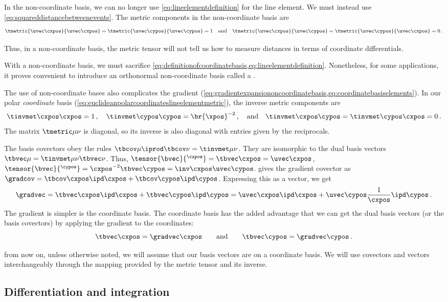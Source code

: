In the non-coordinate basis, we can no longer use \cref{eq:lineelementdefinition} for the line element. We must instead use \cref{eq:squareddistancebetweenevents}. The metric components in the non-coordinate basis are
%
\begin{equation}\label{eq:metriccomponentsinnoncoordinatebasis}
  \tmetric{\uvec\cxpos}{\uvec\cxpos} = \tmetric{\uvec\cypos}{\uvec\cypos} = 1\quad\text{and}\quad
  \tmetric{\uvec\cxpos}{\uvec\cypos} = \tmetric{\uvec\cypos}{\uvec\cxpos} = 0\,.
\end{equation}

 Thus, in a non-coordinate basis, the metric tensor will not tell us how to measure distances in terms of coordinate differentials.

With a non-coordinate basis, we must sacrifice \cref{eq:definitionofcoordinatebasis,eq:lineelementdefinition}. Nonetheless, for some applications, it proves convenient to introduce an orthonormal non-coordinate basis called a .

 The use of non-coordinate bases also complicates the gradient (\cref{eq:gradientexpansiononcoordinatebasis,eq:coordinatebasiselements}). In our polar \emph{coordinate} basis (\cref{eq:euclideanpolarcoordinateslineelementmetric}), the inverse metric components are
%
\begin{equation}\label{eq:invmetriccomponentsincoordinatebasis}
  \tinvmet\cxpos\cxpos = 1\,,\quad
  \tinvmet\cypos\cypos = \br{\xpos}^{-2}\,,\quad\text{and}\quad
  \tinvmet\cxpos\cypos = \tinvmet\cypos\cxpos = 0\,.
\end{equation}
%
 The matrix $\tmetric\mu\nu$ is diagonal, so its inverse is also diagonal with entries given by the reciprocals.

The basis covectors obey the rules $\tbcov\mu\iprod\tbcov\nu = \tinvmet\mu\nu$. They are isomorphic to the dual basis vectors $\tbvec\mu = \tinvmet\mu\nu\tbvec\nu$. Thus, $\tensor{\bvec}{^\cxpos} = \tbvec\cxpos = \uvec\cxpos$, $\tensor{\bvec}{^\cypos} = \cxpos^{-2}\tbvec\cypos = \inv\cxpos\uvec\cypos$.  gives the gradient covector as $\gradcov = \tbcov\cxpos\ipd\cxpos + \tbcov\cypos\ipd\cypos$. Expressing this as a vector, we get
%
\begin{equation}\label{eq:gradientvectorinpolarcoordinates}
  \gradvec = \tbvec\cxpos\ipd\cxpos + \tbvec\cypos\ipd\cypos
           = \uvec\cxpos\ipd\cxpos + \uvec\cypos\dfrac 1\cxpos\ipd\cypos\,.
\end{equation}
%
 The gradient is simpler is the coordinate basis. The coordinate basis has the added advantage that we can get the dual basis vectors (or the basis covectors) by applying the gradient to the coordinates:
%
\begin{equation*}
  \tbvec\cxpos = \gradvec\cxpos\qquad\text{and}\qquad
  \tbvec\cypos = \gradvec\cypos\,.
\end{equation*}

 from now on, unless otherwise noted, we will assume that our basis vectors are on a coordinate basis. We will use covectors and vectors interchangeably through the mapping provided by the metric tensor and its inverse.


\subsection{Differentiation and integration}
%


